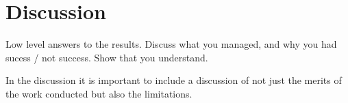 \section{Discussion}
Low level answers to the results. 
Discuss what you managed, and why you had sucess / not success. 
Show that you understand.

In the discussion it is important to include a discussion of not just the merits of the work conducted but also the limitations. 



